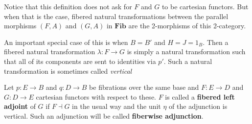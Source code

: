 Notice that this definition does not ask for $F$ and $G$ to be cartesian functors. But when that is the case, fibered natural transformations between the parallel morphisms $(F, A)$ and $(G, A)$ in $\mathbf{Fib}$ are the 2-morphisms of this 2-category.

An important special case of this is when $B = B'$ and $H = J = 1_B$. Then a fibered natural transformation $\lambda : F \to G$ is simply a natural transformation such that all of its components are sent to identities via $p'$. Such a natural transformation is sometimes called \textit{vertical}

\begin{defn}Let $p : E \to B$ and $q : D \to B$ be fibrations over the same base and $F : E \to D$ and $G : D \to E$ cartesian functors with respect to these. $F$ is called a \textbf{fibered left adjoint} of $G$ if $F \dashv G$ in the usual way and the unit $\eta$ of the adjunction is vertical. Such an adjunction will be called \textbf{fiberwise adjunction}.
\end{defn}

\begin{comment}
TODO: Put this in the right context (maybe leave it out actually)\\
Let $\mathcal{C}$ be a category and $F : \mathcal{C} \to \mathbf{Cat}$ a (pseudo)functor. $\textbf{Cat}_{/*}$ denotes the slice category of categories over the terminal category, i.e. the category constisting of pointed categories $(\mathcal{D}, d)$, $(\mathcal{E}, e)$ as objects and functors $G : \mathcal{D} \to \mathcal{E}$ equipped with morphisms $\gamma : G(d) \to e$ as morphisms.
\begin{defn}
The Grothendieck construction $\int F$ of $F$ is the pullback of the following diagram:
\[
\ti
\int F \ar[r] \ar[d] & \textbf{Cat}_{/*} \ar[d, "U"] \\
\mathcal{C} \ar[r, "F"] & \textbf{Cat} \\
\kz
\]
\end{defn}
In other words, the category whose objects consists of pairs $(a, b)$ where $a \in \Ob(\mathcal{C})$ and $b \in F(a)$, and whose morphisms $f : (a, b) \to (\alpha, \beta)$ are pairs $(f, g)$ where $f: a \to \alpha$ and $g : F(f)(b) \to \beta$.
\end{comment}
